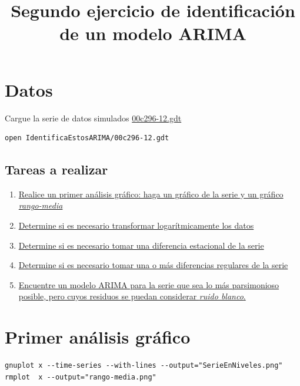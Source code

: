 \documentclass[10pt]{article}
\date{}
\title{Segundo ejercicio de identificación de un modelo ARIMA}
\begin{document}
\maketitle
\section*{Datos}
\label{sec:org7527a7f}

Cargue la serie de datos simulados \href{IdentificaEstosARIMA/00c296-12.gdt}{00c296-12.gdt}

\begin{verbatim}
open IdentificaEstosARIMA/00c296-12.gdt
\end{verbatim}
\subsection*{Tareas a realizar}
\label{sec:org2a61fd3}

\begin{enumerate}
\item \hyperref[sec:orgcf14149]{Realice un primer análisis gráfico: haga
un gráfico de la serie y un gráfico \emph{rango-media}}
\item \hyperref[sec:orgeb2946e]{Determine si es necesario transformar logarítmicamente los datos}
\item \hyperref[sec:orgecfb6ad]{Determine si es necesario tomar una
diferencia estacional de la serie}
\item \hyperref[sec:org8719850]{Determine si es necesario tomar una o
más diferencias regulares de la serie}
\item \hyperref[sec:orgdf66cd7]{Encuentre un modelo ARIMA para la
serie que sea lo más parsimonioso posible, pero cuyos residuos se
puedan considerar \emph{ruido blanco}.}
\end{enumerate}
\section*{Primer análisis gráfico}
\label{sec:orgcf14149}


\begin{verbatim}
gnuplot x --time-series --with-lines --output="SerieEnNiveles.png"
rmplot  x --output="rango-media.png"
\end{verbatim}
\end{document}
